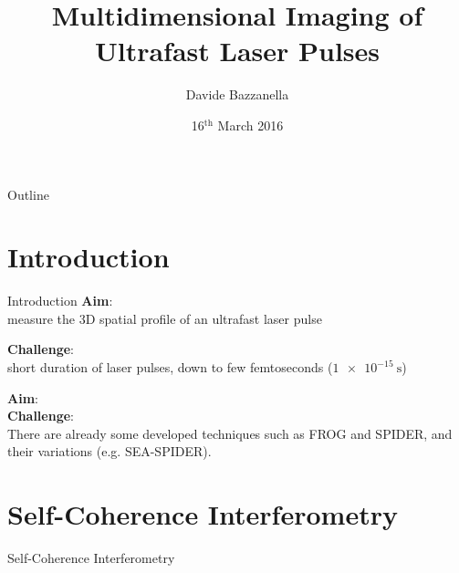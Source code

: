 \documentclass[11pt]{beamer}
\author{Davide Bazzanella}
\title{Multidimensional Imaging of Ultrafast Laser Pulses}
\institute{Imperial College London}
\date{16$^{\mathrm{th}}$ March 2016}
\begin{document}
\begin{frame}
\titlepage
\end{frame}

\begin{frame}{Outline}
\tableofcontents
\end{frame}

\section{Introduction}
\begin{frame}{Introduction}
\textbf{Aim}:\\
	measure the 3D spatial profile of an ultrafast laser pulse
	
	\vspace{5pt}
\textbf{Challenge}:\\
	short duration of laser pulses, down to few femtoseconds ($\SI{1e-15}{\s}$)
\end{frame}

\begin{frame}

\textbf{Aim}:\\
	
	\vspace{5pt}
\textbf{Challenge}:\\
	
There are already some developed techniques such as FROG and SPIDER, and their variations (e.g. SEA-SPIDER).

\end{frame}

\section{Self-Coherence Interferometry}
\begin{frame}{Self-Coherence Interferometry}

\end{frame}
\end{document}

